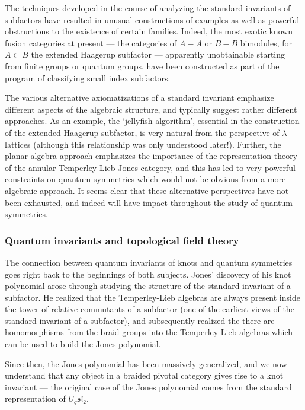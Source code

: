 \documentclass[11pt]{article}
\begin{document}
The techniques developed in the course of analyzing the standard invariants of
subfactors have resulted in unusual constructions of examples as well as
powerful obstructions to the existence of certain families. Indeed, the most
exotic known fusion categories at present --- the categories of $A-A$ or $B-B$
bimodules, for $A \subset B$ the extended Haagerup subfactor --- apparently
unobtainable starting from finite groups or quantum groups, have been
constructed as part of the program of classifying small index subfactors.

The various alternative axiomatizations of a standard invariant emphasize
different aspects of the algebraic structure, and typically suggest rather
different approaches. As an example, the `jellyfish algorithm', essential in
the construction of the extended Haagerup subfactor, is very natural from the
perspective of $\lambda$-lattices (although this relationship was only
understood later!). Further, the planar algebra approach emphasizes the
importance of the representation theory of the annular Temperley-Lieb-Jones
category, and this has led to very powerful constraints on quantum symmetries
which would not be obvious from a more algebraic approach. It seems clear that
these alternative perspectives have not been exhausted, and indeed will have
impact throughout the study of quantum symmetries.



\subsubsection{Quantum invariants and topological field theory}
The connection between quantum invariants of knots and quantum symmetries goes right back to the beginnings of both subjects. Jones' discovery of his knot polynomial arose through studying the structure of the standard invariant of a subfactor. He
realized that the Temperley-Lieb algebras are always present inside the tower of relative commutants of a subfactor (one of the earliest views of the standard invariant of a subfactor),
and subsequently realized the there are homomorphisms from the braid groups into the Temperley-Lieb algebras which can be used to build the Jones polynomial.

Since then, the Jones polynomial has been massively generalized, and we now understand that any object in a braided pivotal category  gives rise to a knot invariant --- the original case of the Jones polynomial comes from the standard representation of $U_q \mathfrak{sl}_2$.
\end{document}
